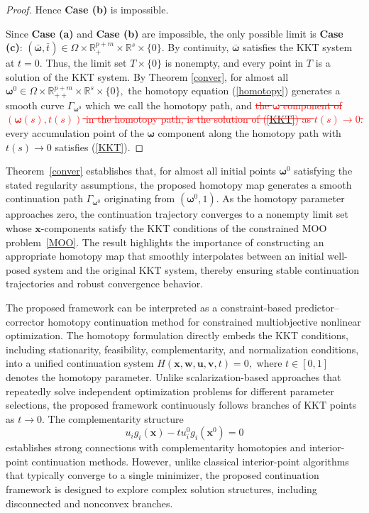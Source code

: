 \documentclass[11pt,pdflatex,sn-mathphys-ay]{sn-jnl}%
\theoremstyle{definition}
\theoremstyle{thmstyleone}%
\theoremstyle{thmstyletwo}%
\theoremstyle{thmstylethree}%
\newcommand{\del}[1]{\textcolor{red}{\sout{#1}}}
\newcommand{\add}[1]{\textcolor{revisionblue}{#1}}
\begin{document}
\begin{proof}
		\noindent Hence \textbf{Case (b)} is impossible.
		
		Since \textbf{Case (a)} and \textbf{Case (b)} are impossible, the only possible limit is \textbf{Case (c)}: $(\bar{\bm{\omega}}, \bar{t}) \in \Omega \times \mathbb{R}^{p+m}_{+} \times \mathbb{R}^s \times \{0\}$. By continuity, $\bar{\bm{\omega}}$ satisfies the KKT system at $t = 0$. Thus, the limit set $T \times \{0\}$ is nonempty, and every point in $T$ is a solution of the KKT system. 
		\medskip
		By Theorem \ref{conver}, for almost all $\bm{\omega}^0\in \Omega\times
		\mathbb{R}^{p+m}_{++}\times \mathbb{R}^s\times\{0\},$ the homotopy equation
		(\ref{homotopy}) generates a smooth curve $\Gamma_{\bm{\omega}^0}$ which
		we call the homotopy path, and 
		\del{the $\bm{\omega}$ component of
			$(\bm{\omega}(s), t(s))$ in the homotopy path,
			is the solution of (\ref{KKT}) as
			$t(s)\rightarrow 0$.}
		\add{every accumulation point of the
			$\bm{\omega}$ component along the homotopy
			path with $t(s)\rightarrow0$ satisfies
			(\ref{KKT}).}
		
	\end{proof}
	Theorem~\ref{conver} establishes that, for almost all initial points \(\bm{\omega}^0\) satisfying the stated regularity assumptions, the proposed homotopy map generates a smooth continuation path \(\Gamma_{\bm{\omega}^0}\) originating from \((\bm{\omega}^0,1)\). As the homotopy parameter approaches zero, the continuation trajectory converges to a nonempty limit set whose \(\bm{x}\)-components satisfy the KKT conditions of the constrained MOO problem~\eqref{MOO}. The result highlights the importance of constructing an appropriate homotopy map that smoothly interpolates between an initial well-posed system and the original KKT system, thereby ensuring stable continuation trajectories and robust convergence behavior.
	
	The proposed framework can be interpreted as a constraint-based predictor--corrector homotopy continuation method for constrained multiobjective nonlinear optimization. The homotopy formulation directly embeds the KKT conditions, including stationarity, feasibility, complementarity, and normalization conditions, into a unified continuation system $H(\bm{x},\textbf{w},\bm{u},\bm{v},t)=0,$
	where \(t\in[0,1]\) denotes the homotopy parameter. Unlike scalarization-based approaches that repeatedly solve independent optimization problems for different parameter selections, the proposed framework continuously follows branches of KKT points as \(t\to0\). The complementarity structure
	\[
	u_i g_i(\bm{x})-t u_i^0 g_i(\bm{x}^0)=0
	\]
	establishes strong connections with complementarity homotopies and interior-point continuation methods. However, unlike classical interior-point algorithms that typically converge to a single minimizer, the proposed continuation framework is designed to explore complex solution structures, including disconnected and nonconvex branches.
	
\end{document}
